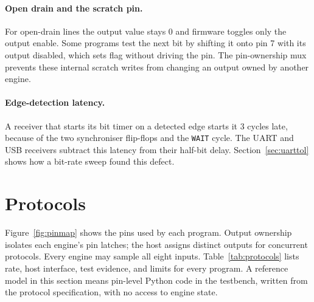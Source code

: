 \documentclass[11pt]{article}
\newcommand{\sig}[1]{\texttt{\detokenize{#1}}}
\begin{document}
\paragraph{Open drain and the scratch pin.}
For open-drain lines the output value stays 0 and firmware toggles only the output enable.
Some programs test the next \sig{osr} bit by shifting it onto pin 7 with its output disabled, which sets flag \sig{b} without driving the pin.
The pin-ownership mux prevents these internal scratch writes from changing an output owned by another engine.

\paragraph{Edge-detection latency.}
A receiver that starts its bit timer on a detected edge starts it 3 cycles late, because of the two synchroniser flip-flops and the \texttt{WAIT} cycle.
The UART and USB receivers subtract this latency from their half-bit delay.
Section~\ref{sec:uarttol} shows how a bit-rate sweep found this defect.

\section{Protocols}

Figure~\ref{fig:pinmap} shows the pins used by each program.
Output ownership isolates each engine's pin latches; the host assigns distinct outputs for concurrent protocols. Every engine may sample all eight inputs.
Table~\ref{tab:protocols} lists rate, host interface, test evidence, and limits for every program.
A reference model in this section means pin-level Python code in the testbench, written from the protocol specification, with no access to engine state.
\end{document}
